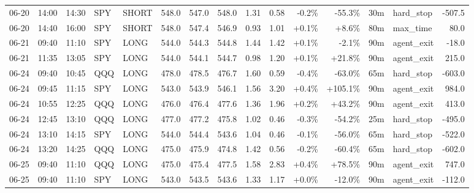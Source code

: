\documentclass[11pt,a4paper,twoside]{article}
\begin{document}
\begin{landscape}
\begin{center}
\begin{longtable}{>{\color{txtmain}}l l l l l r r r r r r r r >{\color{txtmain}}l r}
06-20 & 14:00 & 14:30 & SPY & SHORT & 548.0 & 547.0 & 548.0 & 1.31 & 0.58 & \textcolor{lossred}{-0.2\%} & \textcolor{lossred}{-55.3\%} & 30m & hard\_stop & \textcolor{lossred}{-507.5} \\
06-20 & 14:40 & 16:00 & SPY & SHORT & 548.0 & 547.4 & 546.9 & 0.93 & 1.01 & \textcolor{wingreen}{+0.1\%} & \textcolor{wingreen}{+8.6\%} & 80m & max\_time & \textcolor{wingreen}{80.0} \\
06-21 & 09:40 & 11:10 & SPY & LONG & 544.0 & 544.3 & 544.8 & 1.44 & 1.42 & \textcolor{wingreen}{+0.1\%} & \textcolor{lossred}{-2.1\%} & 90m & agent\_exit & \textcolor{lossred}{-18.0} \\
06-21 & 11:35 & 13:05 & SPY & LONG & 544.0 & 544.1 & 544.7 & 0.98 & 1.20 & \textcolor{wingreen}{+0.1\%} & \textcolor{wingreen}{+21.8\%} & 90m & agent\_exit & \textcolor{wingreen}{215.0} \\
06-24 & 09:40 & 10:45 & QQQ & LONG & 478.0 & 478.5 & 476.7 & 1.60 & 0.59 & \textcolor{lossred}{-0.4\%} & \textcolor{lossred}{-63.0\%} & 65m & hard\_stop & \textcolor{lossred}{-603.0} \\
06-24 & 09:45 & 11:15 & SPY & LONG & 543.0 & 543.9 & 546.1 & 1.56 & 3.20 & \textcolor{wingreen}{+0.4\%} & \textcolor{wingreen}{+105.1\%} & 90m & agent\_exit & \textcolor{wingreen}{984.0} \\
06-24 & 10:55 & 12:25 & QQQ & LONG & 476.0 & 476.4 & 477.6 & 1.36 & 1.96 & \textcolor{wingreen}{+0.2\%} & \textcolor{wingreen}{+43.2\%} & 90m & agent\_exit & \textcolor{wingreen}{413.0} \\
06-24 & 12:45 & 13:10 & QQQ & LONG & 477.0 & 477.2 & 475.8 & 1.02 & 0.46 & \textcolor{lossred}{-0.3\%} & \textcolor{lossred}{-54.2\%} & 25m & hard\_stop & \textcolor{lossred}{-495.0} \\
06-24 & 13:10 & 14:15 & SPY & LONG & 544.0 & 544.4 & 543.6 & 1.04 & 0.46 & \textcolor{lossred}{-0.1\%} & \textcolor{lossred}{-56.0\%} & 65m & hard\_stop & \textcolor{lossred}{-522.0} \\
06-24 & 13:20 & 14:25 & QQQ & LONG & 475.0 & 475.9 & 474.8 & 1.42 & 0.56 & \textcolor{lossred}{-0.2\%} & \textcolor{lossred}{-60.4\%} & 65m & hard\_stop & \textcolor{lossred}{-602.0} \\
06-25 & 09:40 & 11:10 & QQQ & LONG & 475.0 & 475.4 & 477.5 & 1.58 & 2.83 & \textcolor{wingreen}{+0.4\%} & \textcolor{wingreen}{+78.5\%} & 90m & agent\_exit & \textcolor{wingreen}{747.0} \\
06-25 & 09:40 & 11:10 & SPY & LONG & 543.0 & 543.5 & 543.6 & 1.33 & 1.17 & \textcolor{wingreen}{+0.0\%} & \textcolor{lossred}{-12.0\%} & 90m & agent\_exit & \textcolor{lossred}{-112.0} \\

\end{longtable}
\end{center}
\end{landscape}
\end{document}
